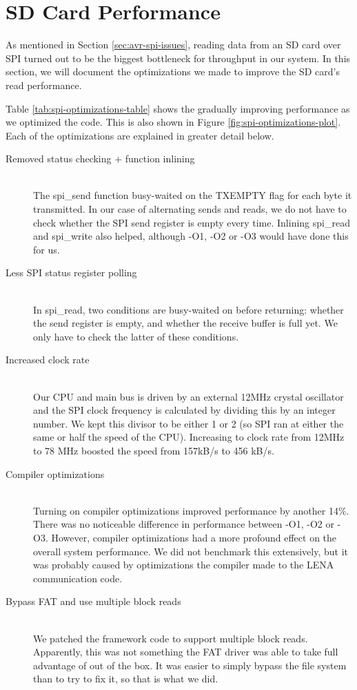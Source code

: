 \section{SD Card Performance}
\label{sec:performance-sd-card}

As mentioned in Section \ref{sec:avr-spi-issues}, reading data from an
SD card over SPI turned out to be the biggest bottleneck for throughput
in our system. In this section, we will document the optimizations we
made to improve the SD card's read performance.

Table \ref{tab:spi-optimizations-table} shows the gradually improving
performance as we optimized the code. This is also shown in Figure
\ref{fig:spi-optimizations-plot}. Each of the optimizations are
explained in greater detail below.

\begin{description}
	\item[Removed status checking + function inlining] \hfill \\
		The spi\_send function busy-waited on the TXEMPTY flag for each
		byte it transmitted. In our case of alternating sends and reads,
		we do not have to check whether the SPI send register is empty
		every time. Inlining spi\_read and spi\_write also helped,
		although -O1, -O2 or -O3 would have done this for us.
	\item[Less SPI status register polling] \hfill \\
		In spi\_read, two conditions are busy-waited on before
		returning: whether the send register is empty, and whether the
		receive buffer is full yet. We only have to check the latter of
		these conditions.
	\item[Increased clock rate] \hfill \\
		Our CPU and main bus is driven by an external 12MHz crystal
		oscillator and the SPI clock frequency is calculated by dividing
		this by an integer number. We kept this divisor to be either 1
		or 2 (so SPI ran at either the same or half the speed of the
		CPU). Increasing to clock rate from 12MHz to 78 MHz boosted the
		speed from 157kB/s to 456 kB/s.
	\item[Compiler optimizations] \hfill \\
		Turning on compiler optimizations improved performance
		by another 14\%. There was no noticeable difference in
		performance between -O1, -O2 or -O3. However, compiler
		optimizations had a more profound effect on the overall system
		performance. We did not benchmark this extensively, but it was
		probably caused by optimizations the compiler made to the \ac{LENA}
		communication code.
	\item[Bypass FAT and use multiple block reads] \hfill \\
		We patched the framework code to support multiple block reads.
		Apparently, this was not something the FAT driver was able to
		take full advantage of out of the box. It was easier to simply
		bypass the file system than to try to fix it, so that is what we
		did.
		

\end{description}
